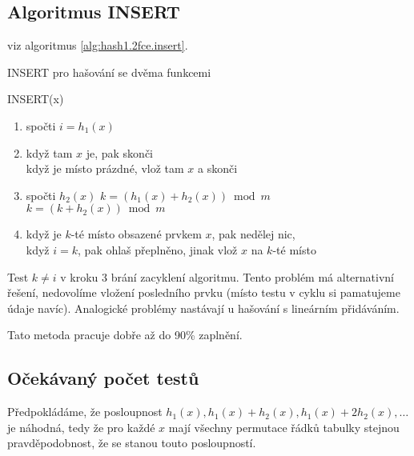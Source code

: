 \def\xx{
Např.: $h(i) = i \bmod 10$, \( h_1(i) = \begin{cases}
1 &\text{když}\ i \equiv 1 \pmod 3 \\
3 &\text{když}\ i \equiv 0 \pmod 3 \\
7 &\text{když}\ i \equiv 2 \pmod 3
\end{cases}
\)
}

\subsection{Algoritmus INSERT}

viz algoritmus \ref{alg:hash1.2fce.insert}.

\begin{algorithm}[!htb]
\caption{INSERT pro hašování se dvěma funkcemi}
\label{alg:hash1.2fce.insert}
INSERT(x)
\begin{enumerate}
\item 
 spočti $i=h_1(x)$
\item
 když tam $x$ je, pak skonči\\
 když je místo prázdné, vlož tam $x$ a skonči
\item 
 \begin{algorithmic}
 \STATE spočti $h_2(x)$
 \STATE $k = (h_1(x)+h_2(x)) \bmod m$
   \STATE \quad $k = (k+h_2(x)) \bmod m$
 \ENDWHILE
 \ENDIF
 \end{algorithmic}
\item
 když je $k$-té místo obsazené prvkem $x$, pak nedělej nic,\\ 
 když $i=k$, pak ohlaš přeplněno, jinak vlož $x$ na
 $k$-té místo
\end{enumerate}
\end{algorithm}


Test $k\ne i$ v kroku 3 brání zacyklení algoritmu. Tento problém má 
alternativní řešení, nedovolíme vložení posledního prvku (místo testu v  
cyklu si pamatujeme údaje navíc). Analogické problémy nastávají 
u hašování s lineárním přidáváním. 

Tato metoda pracuje dobře až do 90\% zaplnění.

\subsection{Očekávaný počet testů}

Předpokládáme, že posloupnost $h_1(x), h_1(x)+h_2(x), h_1(x)+2h_2(x), \dots$
je náhodná, tedy že pro každé $x$ mají všechny permutace řádků tabulky stejnou
pravděpodobnost, že se stanou touto posloupností.

